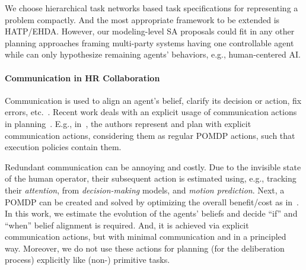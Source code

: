 \documentclass[letterpaper]{article} %
\begin{document}
We choose hierarchical task networks based task specifications for representing a problem compactly. And the most appropriate framework to be extended is HATP/EHDA.
However, our modeling-level SA proposals could fit in any other planning approaches framing multi-party systems having one
controllable agent while can only hypothesize remaining agents' behaviors, e.g., human-centered AI.


\paragraph{Communication in HR Collaboration}
Communication 
is used to align an agent's belief, clarify its decision or action, fix errors, etc.~\cite{tellex2014asking,sebastiani2017dealing}. 
Recent work deals with an explicit usage of communication actions in planning~\cite{BuisanSA20,nikolaidis2018planning,roncone2017transparent,sanelli2017short,UnhelkarLS20}. 
E.g., in~\cite{roncone2017transparent,UnhelkarLS20}, the authors represent and plan with explicit communication actions, considering them as regular POMDP actions, such that execution policies contain them. 

Redundant communication can be annoying and costly. Due to the invisible state of the human operator, their subsequent action is estimated using, e.g., tracking their \textit{attention}, from   \textit{decision-making} models, and \textit{motion prediction}. 
Next, a POMDP can be created and solved by optimizing the overall benefit/cost as in~\cite{UnhelkarLS20}. 
In this work, 
we estimate the evolution of the agents' beliefs and decide ``if'' and ``when'' belief alignment is required. And, it is achieved via explicit communication actions, 
but with minimal communication and in a principled way. Moreover, we do not use these actions for planning (for the deliberation process) explicitly like (non-) primitive tasks.    
\end{document}
